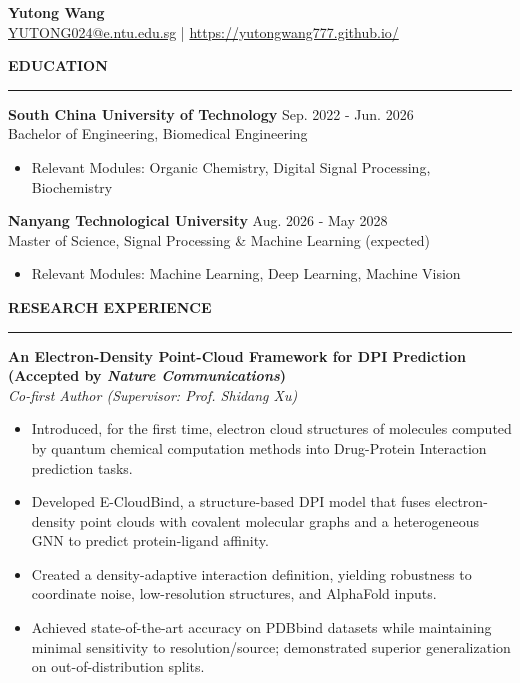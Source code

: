 \documentclass[11pt,a4paper]{article}
\newcommand{\cvsection}[1]{\vspace{0.8em}\textbf{\MakeUppercase{#1}}\par\vspace{-0.5em}\noindent\rule{\linewidth}{0.4pt}\par\vspace{-0.5em}}
\newcommand{\project}[3]{\vspace{0.8em}\textbf{#1}\\\textit{#3}\par}
\begin{document}
\begin{center}
    {\large\bfseries Yutong Wang}\\[2pt]
    \href{mailto:YUTONG024@e.ntu.edu.sg}{YUTONG024@e.ntu.edu.sg} \;|\; \href{https://yutongwang777.github.io/}{https://yutongwang777.github.io/}
\end{center}
\vspace{-1em}

\cvsection{Education}
\vspace{0.8em}
\textbf{South China University of Technology} \hfill Sep. 2022 - Jun. 2026\\
Bachelor of Engineering, Biomedical Engineering
\begin{itemize}
    \item Relevant Modules: Organic Chemistry, Digital Signal Processing, Biochemistry
\end{itemize}

\textbf{Nanyang Technological University} \hfill Aug. 2026 - May 2028\\
Master of Science, Signal Processing \& Machine Learning \hfill (expected)
\begin{itemize}
    \item Relevant Modules: Machine Learning, Deep Learning, Machine Vision
\end{itemize}

\cvsection{Research Experience}
\project{An Electron-Density Point-Cloud Framework for DPI Prediction\\(Accepted by \textit{Nature Communications})}{Xu Lab (SCUT)}{Co-first Author (Supervisor: Prof. Shidang Xu)}
\begin{itemize}
    \item Introduced, for the first time, electron cloud structures of molecules computed by quantum chemical computation methods into Drug-Protein Interaction prediction tasks.
    \item Developed E-CloudBind, a structure-based DPI model that fuses electron-density point clouds with covalent molecular graphs and a heterogeneous GNN to predict protein-ligand affinity.
    \item Created a density-adaptive interaction definition, yielding robustness to coordinate noise, low-resolution structures, and AlphaFold inputs.
    \item Achieved state-of-the-art accuracy on PDBbind datasets while maintaining minimal sensitivity to resolution/source; demonstrated superior generalization on out-of-distribution splits.
\end{itemize}
\end{document}
